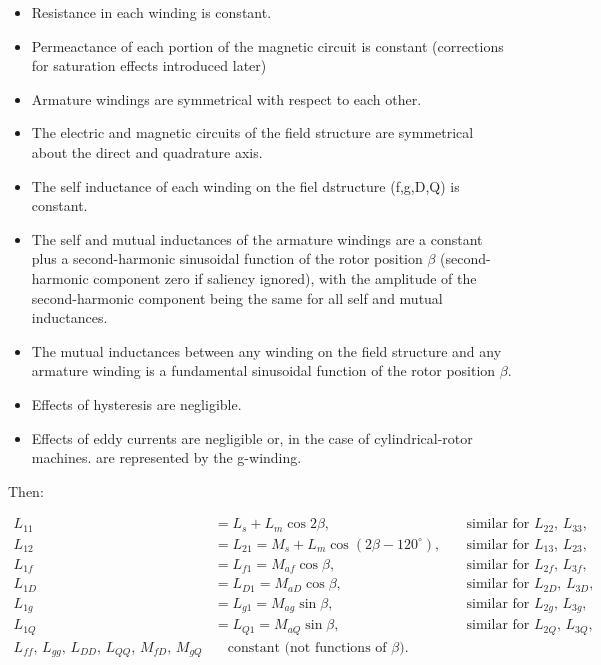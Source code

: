 \begin{itemize}
    \item Resistance in each winding is constant.
    \item Permeactance of each portion of the magnetic circuit is constant (corrections for saturation effects introduced later)
    \item Armature windings are symmetrical with respect to each other.
    \item The electric and magnetic circuits of the field structure are symmetrical about the direct and quadrature axis.
    \item The self inductance of each winding on the fiel dstructure (f,g,D,Q) is constant.
    \item The self and mutual inductances of the armature windings are a constant plus a second-harmonic sinusoidal function of 
    the rotor position $\beta$ (second-harmonic component zero if saliency ignored), with the amplitude of the second-harmonic
    component being the same for all self and mutual inductances.
    \item The mutual inductances between any winding on the field structure and any armature winding is a fundamental sinusoidal function
    of the rotor position $\beta$.
    \item Effects of hysteresis are negligible.
    \item Effects of eddy currents are negligible or, in the case of cylindrical-rotor machines. are represented by the g-winding.
    
\end{itemize}

Then:

\begin{equation}
\begin{aligned}
L_{11} &= L_s + L_m \cos 2\beta, 
&\quad \text{similar for } L_{22},\, L_{33}, \\[4pt]
L_{12} &= L_{21} = M_s + L_m \cos(2\beta - 120^\circ),
&\quad \text{similar for } L_{13},\, L_{23}, \\[4pt]
L_{1f} &= L_{f1} = M_{af} \cos \beta,
&\quad \text{similar for } L_{2f},\, L_{3f}, \\[4pt]
L_{1D} &= L_{D1} = M_{aD} \cos \beta,
&\quad \text{similar for } L_{2D},\, L_{3D}, \\[4pt]
L_{1g} &= L_{g1} = M_{ag} \sin \beta,
&\quad \text{similar for } L_{2g},\, L_{3g}, \\[4pt]
L_{1Q} &= L_{Q1} = M_{aQ} \sin \beta,
&\quad \text{similar for } L_{2Q},\, L_{3Q}, \\[4pt]
L_{ff},\, L_{gg},\, L_{DD},\, L_{QQ},\, M_{fD},\, M_{gQ}
&\quad \text{constant (not functions of } \beta\text{).}
\end{aligned}
\label{eq:inductances}
\end{equation}

